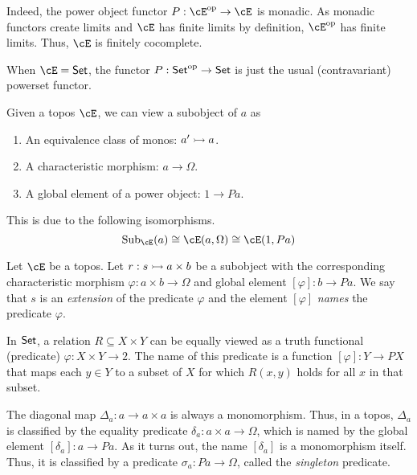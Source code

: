 \documentclass[article,10pt,oneside]{memoir}
\begin{document}
\begin{rmk}
  Indeed, the power object functor $P : \cE\op \to \cE$ is monadic.
  As monadic functors create limits and $\cE$ has finite limits by definition, $\cE\op$ has finite limits.
  Thus, $\cE$ is finitely cocomplete.
\end{rmk}

\begin{eg}
  When $\cE = \CSet$, the functor $P : \mathsf{Set}^{\mathrm{op}} \to \mathsf{Set}$ is just the usual (contravariant) powerset functor.
\end{eg}

\begin{rmk}
  Given a topos $\cE$, we can view a subobject of $a$ as
  \begin{enumerate}
  \item An equivalence class of monos: $a' \rightarrowtail a$.
  \item A characteristic morphism: $a \to \Omega$.
  \item A global element of a power object: $1 \to Pa$.
  \end{enumerate}
  This is due to the following isomorphisms.
  \[
    \Sub_{\cE}(a) \iso \cE(a, \Omega) \iso \cE(1, Pa)
  \]
\end{rmk}

\begin{defn}
  Let $\cE$ be a topos.
  Let $r : s \rightarrowtail a \times b$ be a subobject with the corresponding characteristic morphism $\varphi : a \times b \to \Omega$ and global element $[\varphi] : b \to Pa$.
  We say that $s$ is an \emph{extension} of the predicate $\varphi$ and the element $[\varphi]$ \emph{names} the predicate $\varphi$.
\end{defn}

\begin{eg}
  In $\mathsf{Set}$, a relation $R \subseteq X \times Y$ can be equally viewed as a truth functional (predicate) $\varphi : X \times Y \to 2$.
  The name of this predicate is a function $[\varphi] : Y \to PX$ that maps each $y \in Y$ to a subset of $X$ for which $R(x, y)$ holds for all $x$ in that subset.
\end{eg}

\begin{eg}\label{eg:singleton-predicate}
  The diagonal map $\Delta_{a} : a \to a \times a$ is always a monomorphism.
  Thus, in a topos, $\Delta_{a}$ is classified by the equality predicate $\delta_{a} : a \times a \to \Omega$, which is named by the global element $[\delta_{a}] : a \to Pa$.
  As it turns out, the name $[\delta_{a}]$ is a monomorphism itself.
  Thus, it is classified by a predicate $\sigma_{a} : Pa \to \Omega$, called the \emph{singleton} predicate.
\end{eg}
\end{document}
